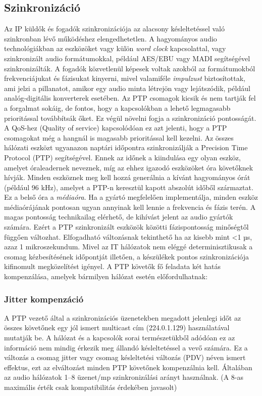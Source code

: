 \subsection{Szinkronizáció}
Az IP küldők és fogadók szinkronizációja az alacsony késleltetéssel való szinkronban lévő működéshez elengedhetetlen.
A hagyományos audio technológiákban az eszközöket vagy külön \textit{word clock} kapcsolattal, 
vagy szinkronizált audio formátumokkal, például AES/EBU vagy MADI segítségével szinkronizálták.
A fogadók közvetlenül képesek voltak azokból az formátumokból frekvenciájukat és fázisukat kinyerni,
mivel valamiféle \textit{impulzust} biztosítottak, ami jelzi a pillanatot, amikor egy
audio minta létrejön vagy lejátszódik, például analóg-digitális konverterek esetében.
Az PTP csomagok kicsik és nem tartják fel a forgalmat sokáig, de fontos, hogy a
kapcsolókban a lehető legmagasabb prioritással továbbítsák őket. 
Ez végül növelni fogja a szinkronizáció pontosságát. 
A QoS-hez (Quality of service) kapcsolódóan ez azt jelenti, hogy a PTP csomagokat még a hangnál is magasabb prioritással kell
kezelni. Az összes hálózati eszközt ugyanazon naptári időpontra szinkronizálják a Precision Time Protocol
(PTP) segítségével. Ennek az időnek a kiindulása egy olyan eszköz, amelyet óraleadernek
neveznek, míg az ehhez igazodó eszközöket óra követőknek hívják. 
Minden eszköznek meg kell hozzá generálnia a kívánt hagyományos órát (például 96 kHz), amelyet a PTP-n keresztül kapott
abszolút időből származtat. Ez a belső óra a \textit{médiaóra}. 
Ha a gyártó megfelelően implementálja, minden eszköz médiaórájának pontosan ugyan annyinak kell lennie a
frekvencia és fázis terén. A magas pontosság technikailag elérhető, de kihívást
jelent az audio gyártók számára. Ezért a PTP szinkronizált eszközök közötti
fázispontosság minőségtől függően változhat. Elfogadható változásnak tekinthető ha az kisebb mint <1 µs, azaz 1 mikroszekundum.
Mivel az IT hálózatok nem eléggé determinisztikusak a csomag kézbesítésének időpontját
illetően, a készülékek pontos szinkronizációja kifinomult megközelítést igényel.
A PTP követők fő feladata két hatás kompenzálása, amelyek bármilyen hálózat esetén előfordulhatnak:
\subsubsection{Jitter kompenzáció}
A PTP vezető által a szinkronizációs üzenetekben megadott jelenlegi időt az összes követőnek egy jól ismert multicast
cím (224.0.1.129) használatával mutatják be. 
A hálózat és a kapcsolók sorai természetükből adódóan ez az információ nem mindig érkezik meg állandó
késleltetéssel a vevő számára. 
Ez a változás a csomag jitter vagy csomag késleltetési változás (PDV) néven ismert effektus,
ezt az elváltozást minden PTP követőnek kompenzálnia kell. 
Általában az audio hálózatok 1--8 üzenet/mp szinkronizálási arányt
használnak. (A 8-as maximális érték csak kompatibilitás érdekében javasolt)
